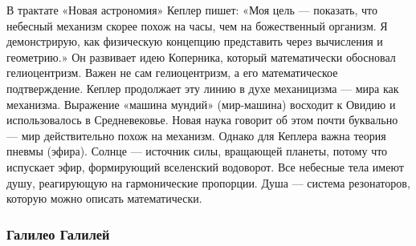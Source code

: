 



В трактате «Новая астрономия» Кеплер пишет: «Моя цель --- показать, что небесный механизм скорее похож на часы, чем на божественный организм. Я демонстрирую, как физическую концепцию представить через вычисления и геометрию.»
Он развивает идею Коперника, который математически обосновал гелиоцентризм. Важен не сам гелиоцентризм, а его математическое подтверждение.
Кеплер продолжает эту линию в духе механицизма --- мира как механизма. Выражение «машина мундий» (мир-машина) восходит к Овидию и использовалось в Средневековье. Новая наука говорит об этом почти буквально --- мир действительно похож на механизм.
Однако для Кеплера важна теория пневмы (эфира). Солнце --- источник силы, вращающей планеты, потому что испускает эфир, формирующий вселенский водоворот.
Все небесные тела имеют душу, реагирующую на гармонические пропорции. Душа --- система резонаторов, которую можно описать математически.


\subsubsection{Галилео Галилей}



